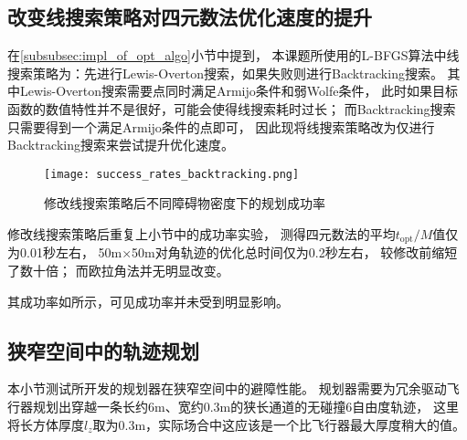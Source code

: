 \subsection{改变线搜索策略对四元数法优化速度的提升}
在\ref{subsubsec:impl_of_opt_algo}小节中提到，
本课题所使用的L-BFGS算法中线搜索策略为：先进行Lewis-Overton搜索，如果失败则进行Backtracking搜索。
其中Lewis-Overton搜索需要点同时满足Armijo条件和弱Wolfe条件，
此时如果目标函数的数值特性并不是很好，可能会使得线搜索耗时过长；
而Backtracking搜索只需要得到一个满足Armijo条件的点即可，
因此现将线搜索策略改为仅进行Backtracking搜索来尝试提升优化速度。

\begin{figure}[ht]
    \centering
    \texttt{[image: success\_rates\_backtracking.png]}
    \caption{修改线搜索策略后不同障碍物密度下的规划成功率}
    \label{fig:success_rates_backtracking}
\end{figure}

修改线搜索策略后重复上小节中的成功率实验，
测得四元数法的平均$t_{\text{opt}}/M$值仅为0.01秒左右，
50m×50m对角轨迹的优化总时间仅为0.2秒左右，
较修改前缩短了数十倍；
而欧拉角法并无明显改变。

其成功率如所示，可见成功率并未受到明显影响。

\subsection{狭窄空间中的轨迹规划}\label{subsec:planning_in_narrow_env}
本小节测试所开发的规划器在狭窄空间中的避障性能。
规划器需要为冗余驱动飞行器规划出穿越一条长约6m、宽约0.3m的狭长通道的无碰撞6自由度轨迹，
这里将长方体厚度$l_z$取为0.3m，实际场合中这应该是一个比飞行器最大厚度稍大的值。

